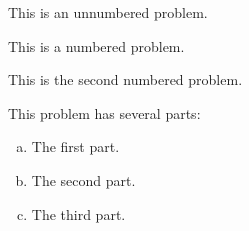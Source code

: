 \documentclass[11pt,letterpaper]{article}
\begin{document}

\prob This is an unnumbered problem. 
	\ansbox{2.5cm}


\problem This is a numbered problem.
	\ansbox{2.5cm}


\problem This is the second numbered problem.
	\ansbox{2.5cm}


 This problem has several parts:
	\begin{enumerate}[(a)]
	\item The first part.
	\item The second part. 
	\item The third part. 
	\end{enumerate}
\ansbox{6cm}
\end{document}

